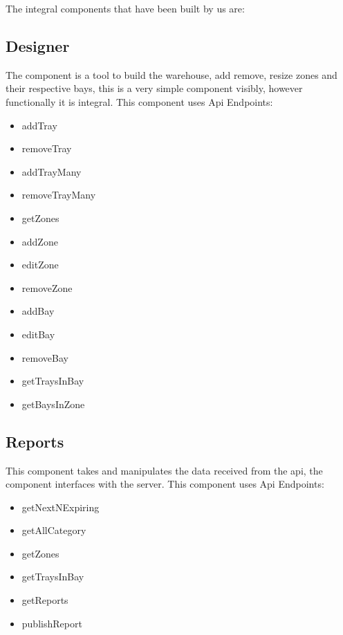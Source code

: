 \documentclass[letterpaper,10pt,english]{sphinxmanual}
\let\oldsubsection\subsection
\renewcommand{\subsection}{\needspace{6\baselineskip}\oldsubsection}
\begin{document}
The integral components that have been built by us are:


\subsection{Designer}
\label{\detokenize{docs/System_Overview/Frontend_overview:designer}}
The component is a tool to build the warehouse, add remove, resize zones
and their respective bays, this is a very simple component visibly,
however functionally it is integral. This component uses Api Endpoints:
\begin{itemize}
\item {} 
addTray

\item {} 
removeTray

\item {} 
addTrayMany

\item {} 
removeTrayMany

\item {} 
getZones

\item {} 
addZone

\item {} 
editZone

\item {} 
removeZone

\item {} 
addBay

\item {} 
editBay

\item {} 
removeBay

\item {} 
getTraysInBay

\item {} 
getBaysInZone

\end{itemize}


\subsection{Reports}
\label{\detokenize{docs/System_Overview/Frontend_overview:reports}}
This component takes and manipulates the data received from the api, the
component interfaces with the server. This component uses Api Endpoints:
\begin{itemize}
\item {} 
getNextNExpiring

\item {} 
getAllCategory

\item {} 
getZones

\item {} 
getTraysInBay

\item {} 
getReports

\item {} 
publishReport

\end{itemize}
\end{document}
